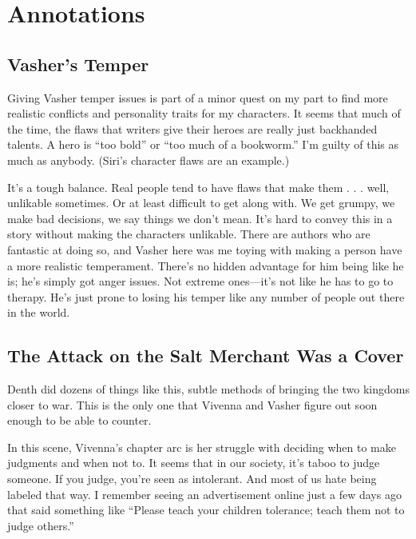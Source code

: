 \section*{Annotations}

\subsection*{Vasher’s Temper}

Giving Vasher temper issues is part of a minor quest on my part to find more realistic conflicts and personality traits for my characters. It seems that much of the time, the flaws that writers give their heroes are really just backhanded talents. A hero is “too bold” or “too much of a bookworm.” I’m guilty of this as much as anybody. (Siri’s character flaws are an example.)

It’s a tough balance. Real people tend to have flaws that make them . . . well, unlikable sometimes. Or at least difficult to get along with. We get grumpy, we make bad decisions, we say things we don’t mean. It’s hard to convey this in a story without making the characters unlikable. There are authors who are fantastic at doing so, and Vasher here was me toying with making a person have a more realistic temperament. There’s no hidden advantage for him being like he is; he’s simply got anger issues. Not extreme ones—it’s not like he has to go to therapy. He’s just prone to losing his temper like any number of people out there in the world.

\subsection*{The Attack on the Salt Merchant Was a Cover}

Denth did dozens of things like this, subtle methods of bringing the two kingdoms closer to war. This is the only one that Vivenna and Vasher figure out soon enough to be able to counter.

In this scene, Vivenna’s chapter arc is her struggle with deciding when to make judgments and when not to. It seems that in our society, it’s taboo to judge someone. If you judge, you’re seen as intolerant. And most of us hate being labeled that way. I remember seeing an advertisement online just a few days ago that said something like “Please teach your children tolerance; teach them not to judge others.”

